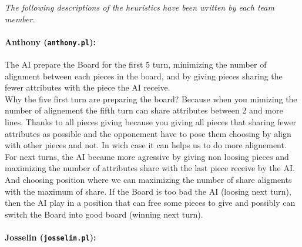 \documentclass[a4paper,12pt]{article}
\newcommand{\tw}[1]{\texttt{#1}}
\begin{document}
		\textit{The following descriptions of the heuristics have been written by each team member.}
		
		\paragraph{Anthony (\tw{anthony.pl}):} The AI prepare the Board for the first 5 turn, minimizing the number of alignment between each pieces in the board, and by giving pieces sharing the fewer attributes with the piece the AI receive. \\
		Why the five first turn are preparing the board? Because when you mimizing the number of alignement the fifth turn can share attributes between 2 and more lines. Thanks to all pieces giving because you giving all pieces that sharing fewer attributes as possible and the opponement have to pose them choosing by align with other pieces and not. In wich case it can helps us to do more alignement. \\
		For next turns, the AI became more agressive by giving non loosing pieces and maximizing the number of attributes share with the last piece receive by the AI. And choosing position where we can maximizing the number of share aligments with the maximum of share. If the Board is too bad the AI (loosing next turn), then the AI play in a position that can free some pieces to give and possibly can switch the Board into good board (winning next turn).

		\paragraph{Josselin (\tw{josselin.pl}):}
\end{document}
